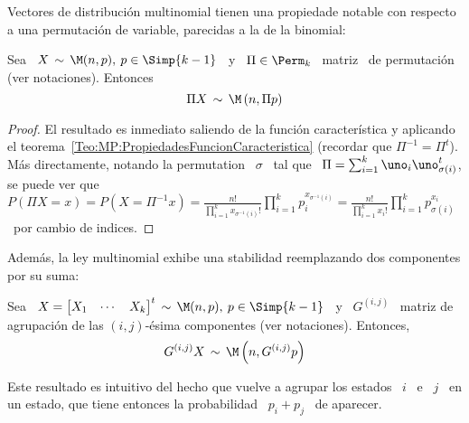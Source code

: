 Vectores  de  distribuci\'on  multinomial  tienen  una  propiedade  notable  con
respecto a una permutaci\'on de variable, parecidas a la de la binomial:
%
\begin{lema}\label{Lem:MP:PermutacionMultinomial}
%
  Sea \ $X \, \sim \, \M(n,p), \: p \in \Simp{k-1}$ \ y \ $\Pi \in \Perm_k$ \
  matriz \ de permutaci\'on (ver notaciones). Entonces
  \[
  \Pi X \, \sim \, \M\left( n ,  \Pi p \right)
  \]
\end{lema}
%
\begin{proof}
  El  resultado  es  inmediato  saliendo  de  la  funci\'on  caracter\'istica  y
  aplicando  el  teorema~\ref{Teo:MP:PropiedadesFuncionCaracteristica} (recordar
  que $\Pi^{-1} = \Pi^t$). M\'as directamente, notando la permutation \ $\sigma$
  \ tal que  \ $\Pi = \sum_{i=1}^k \uno_i \uno_{\sigma(i)}^t$, se  puede ver que \
  $\displaystyle  P(\Pi X =  x) =  P(X =  \Pi^{-1} x)  = \frac{n!}{\prod_{i=1}^k
    x_{\sigma^{-1}(i)}!}       \prod_{i=1}^k      p_i^{x_{\sigma^{-1}(i)}}     =
  \frac{n!}{\prod_{i=1}^k x_i!}  \prod_{i=1}^k p_{\sigma(i)}^{x_i}$ \ por cambio
  de indices.
\end{proof}
%
Adem\'as, la ley multinomial  exhibe una stabilidad reemplazando dos componentes
por su suma:
%
\begin{lema}\label{Lem:MP:StabAgregacionMultinomial}
%
  Sea  \ $X =  \begin{bmatrix} X_1  & \cdots  & X_k  \end{bmatrix}^t \,  \sim \,
  \M(n,p), \:  p \in \Simp{k-1}$ \ y  \ $G^{(i,j)}$ \ matriz  de agrupaci\'on de
  las $(i,j)$-\'esima componentes (ver notaciones). Entonces,
  \[
  G^{(i,j)} X \, \sim \, \M\left( n , G^{(i,j)} p \right)  
  \]
\end{lema}
%
Este resultado es intuitivo del hecho que vuelve a agrupar los estados \ $i$ \ e
\ $j$  \ en un  estado, que tiene  entonces la probabilidad \  $p_i + p_j$  \ de
aparecer.
%
